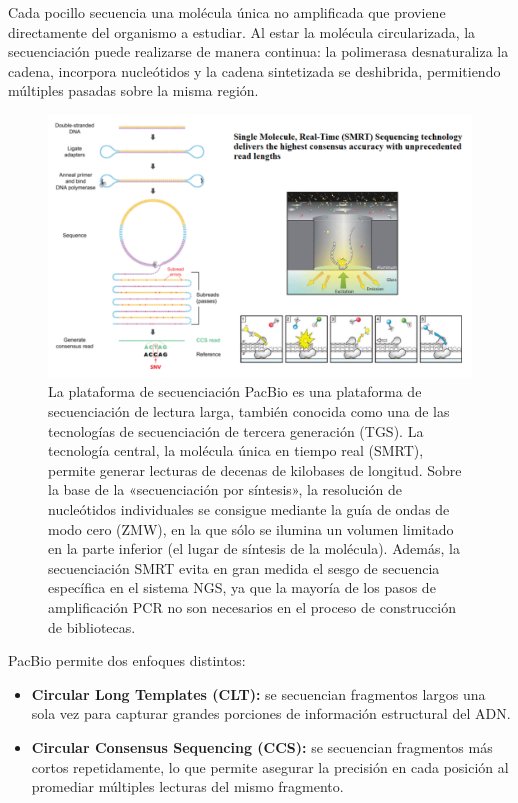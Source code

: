 Cada pocillo secuencia una molécula única no amplificada que proviene directamente del organismo a estudiar. Al estar la molécula circularizada, la secuenciación puede realizarse de manera continua: la polimerasa desnaturaliza la cadena, incorpora nucleótidos y la cadena sintetizada se deshibrida, permitiendo múltiples pasadas sobre la misma región.

\begin{figure}[htbp]
\centering
\includegraphics[width = \textwidth]{figs/pacbio.png}
\caption{La plataforma de secuenciación PacBio es una plataforma de secuenciación de lectura larga, también conocida como una de las tecnologías de secuenciación de tercera generación (TGS). La tecnología central, la molécula única en tiempo real (SMRT), permite generar lecturas de decenas de kilobases de longitud. Sobre la base de la «secuenciación por síntesis», la resolución de nucleótidos individuales se consigue mediante la guía de ondas de modo cero (ZMW), en la que sólo se ilumina un volumen limitado en la parte inferior (el lugar de síntesis de la molécula). Además, la secuenciación SMRT evita en gran medida el sesgo de secuencia específica en el sistema NGS, ya que la mayoría de los pasos de amplificación PCR no son necesarios en el proceso de construcción de bibliotecas.}
\end{figure}

PacBio permite dos enfoques distintos:
\begin{itemize}
\item \textbf{Circular Long Templates (CLT):} se secuencian fragmentos largos una sola vez para capturar grandes porciones de información estructural del ADN.
\item \textbf{Circular Consensus Sequencing (CCS):} se secuencian fragmentos más cortos repetidamente, lo que permite asegurar la precisión en cada posición al promediar múltiples lecturas del mismo fragmento.
\end{itemize}

